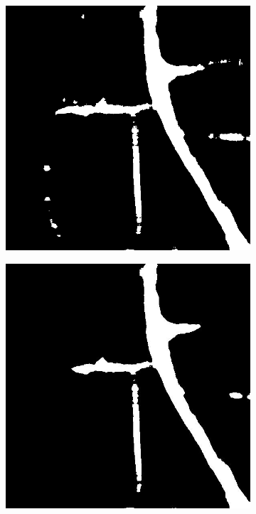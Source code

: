 \begin{figure}
\centering
  \begin{subfigure}[b]{0.3\linewidth}
    \includegraphics[width=\linewidth]{images/pred_190_orig.png}
    \caption{}
  \end{subfigure}
  \begin{subfigure}[b]{0.3\linewidth}
    \includegraphics[width=\linewidth]{images/pred_190_simpleunet.jpg}

\end{subfigure}
\end{figure}
